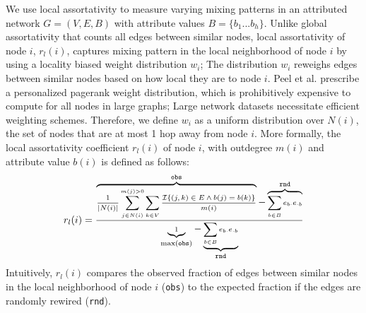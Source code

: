 We use local assortativity \cite{peel2018multiscale} to measure varying
mixing patterns in an attributed network $G=(V,E,B)$ with attribute values $B=\{b_1...b_h\}$.
Unlike global assortativity that counts all edges between similar nodes, local assortativity of node $i$, $r_l(i)$,
captures mixing pattern in the local neighborhood of node $i$ by using a locality biased
weight distribution $w_i$; The distribution $w_i$ reweighs edges between similar nodes
based on how local they are to node $i$. Peel et al. \cite{peel2018multiscale} prescribe a
personalized pagerank weight distribution, which is prohibitively expensive to compute for
all nodes in large graphs; Large network datasets necessitate efficient weighting schemes.
Therefore, we define $w_i$ as a uniform distribution
over $N(i)$, the set of nodes that are at most 1 hop away from node $i$.
More formally, the local assortativity coefficient $r_l(i)$ of node $i$, with outdegree $m(i)$ and
attribute value $b(i)$ is defined as follows:
\vspace{-1mm}
\begin{align*}
    \scriptsize r_l(i) = \frac{\overbrace{\frac{1}{|N(i)|}\sum\limits_{j \in N(i)}^{m(j) > 0} \sum_{k \in V} \frac{\mathcal{I}\{(j,k) \in E \wedge b(j)=b(k)\}}{m(i)} }^{\texttt{obs}}-\overbrace{\sum_{b \in B} e_{b\cdot}e_{\cdot b}}^{\texttt{rnd}}}{\underbrace{1}_{\max(\texttt{obs})}-\underbrace{\sum_{b \in B} e_{b\cdot}e_{\cdot b}}_\texttt{rnd}}
\end{align*}
Intuitively, $r_l(i)$ compares the observed fraction of edges between similar nodes
in the local neighborhood of node $i$ (\texttt{obs}) to the expected fraction
if the edges are randomly rewired (\texttt{rnd}).

